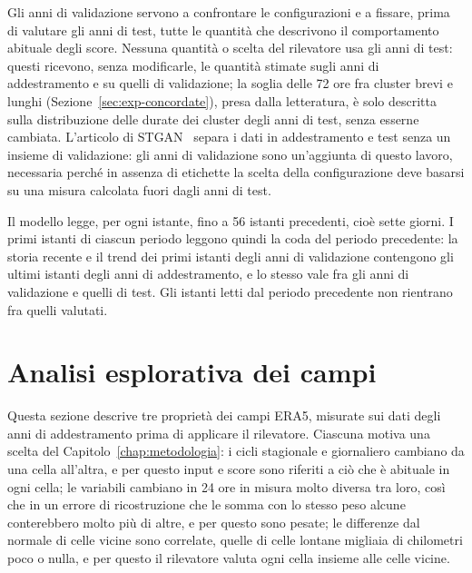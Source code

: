 Gli anni di validazione servono a confrontare le configurazioni e a fissare, prima di valutare gli anni di test, tutte le quantità che descrivono il comportamento abituale degli score. Nessuna quantità o scelta del rilevatore usa gli anni di test: questi ricevono, senza modificarle, le quantità stimate sugli anni di addestramento e su quelli di validazione; la soglia delle 72 ore fra cluster brevi e lunghi (Sezione~\ref{sec:exp-concordate}), presa dalla letteratura, è solo descritta sulla distribuzione delle durate dei cluster degli anni di test, senza esserne cambiata. L'articolo di STGAN~\cite{deng2022stgan} separa i dati in addestramento e test senza un insieme di validazione: gli anni di validazione sono un'aggiunta di questo lavoro, necessaria perché in assenza di etichette la scelta della configurazione deve basarsi su una misura calcolata fuori dagli anni di test.

Il modello legge, per ogni istante, fino a 56 istanti precedenti, cioè sette giorni. I primi istanti di ciascun periodo leggono quindi la coda del periodo precedente: la storia recente e il trend dei primi istanti degli anni di validazione contengono gli ultimi istanti degli anni di addestramento, e lo stesso vale fra gli anni di validazione e quelli di test. Gli istanti letti dal periodo precedente non rientrano fra quelli valutati.

\section{Analisi esplorativa dei campi}
\label{sec:dati-caratteristiche}

Questa sezione descrive tre proprietà dei campi ERA5, misurate sui dati degli anni di addestramento prima di applicare il rilevatore. Ciascuna motiva una scelta del Capitolo~\ref{chap:metodologia}: i cicli stagionale e giornaliero cambiano da una cella all'altra, e per questo input e score sono riferiti a ciò che è abituale in ogni cella; le variabili cambiano in 24 ore in misura molto diversa tra loro, così che in un errore di ricostruzione che le somma con lo stesso peso alcune conterebbero molto più di altre, e per questo sono pesate; le differenze dal normale di celle vicine sono correlate, quelle di celle lontane migliaia di chilometri poco o nulla, e per questo il rilevatore valuta ogni cella insieme alle celle vicine.

